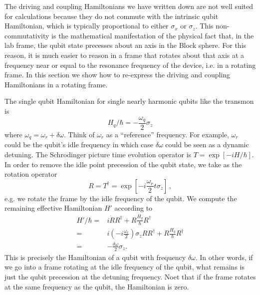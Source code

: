 
The driving and coupling Hamiltonians we have written down are not well suited for calculations because they do not commute with the intrinsic qubit Hamiltonian, which is typically proportional to either $\sigma_x$ or $\sigma_z$.
This non-commutativity is the mathematical manifestation of the physical fact that, in the lab frame, the qubit state precesses about an axis in the Block sphere.
For this reason, it is much easier to reason in a frame that rotates about that axis at a frequency near or equal to the resonance frequency of the device, i.e. in a rotating frame.
In this section we show how to re-express the driving and coupling Hamiltonians in a rotating frame.

The single qubit Hamiltonian for single nearly harmonic qubits like the transmon is \begin{equation}
H_q/\hbar = -\frac{\omega_q}{2}\sigma_z \end{equation}
where $\omega_q = \omega_r + \delta\omega$.
Think of $\omega_r$ as a ``reference'' frequency.
For example, $\omega_r$ could be the qubit's idle frequency in which case $\delta \omega$ could be seen as a dynamic detuning.
The Schrodinger picture time evolution operator is $T=\exp \left[-i H/\hbar \right]$.
In order to remove the idle point precession of the qubit state, we take as the rotation operator \begin{equation}
  R = T^{\dagger} = \exp \left[ -i \frac{\omega_r}{2} t \sigma_z \right] \, ,
\end{equation}
e.g. we rotate the frame by the idle frequency of the qubit.
We compute the remaining effective Hamiltonian $H'$ according to 
\begin{align}
  H'/\hbar
  =& i\dot{R}R^{\dagger} + R \frac{H_q}{\hbar} R^\dagger \nonumber \\
  =& i \left(-i \frac{\omega_r}{2} \right)\sigma_z RR^{\dagger}
    + R\frac{H_q}{\hbar}R^{\dagger} \nonumber \\
  =& -\frac{\delta\omega}{2}\sigma_z.
\end{align}
This is precisely the Hamiltonian of a qubit with frequency $\delta\omega$.
In other words, if we go into a frame rotating at the idle frequency of the qubit, what remains is just the qubit precession at the detuning frequency.
Noet that if the frame rotates at the same frequency as the qubit, the Hamiltonian is zero.


